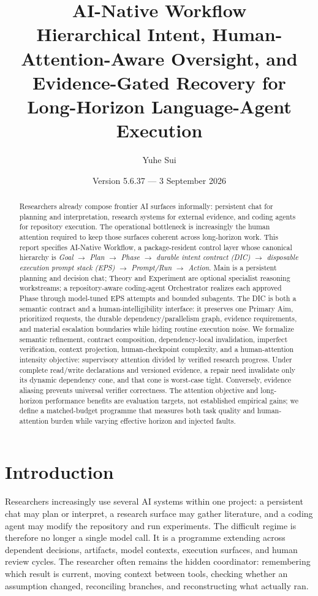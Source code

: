 \documentclass[11pt]{article}
\title{\textbf{AI-Native Workflow}\\\large Hierarchical Intent, Human-Attention-Aware Oversight, and Evidence-Gated Recovery for Long-Horizon Language-Agent Execution}
\author{Yuhe Sui}
\date{Version 5.6.37 --- 3 September 2026}
\begin{document}
\maketitle

\begin{abstract}
Researchers already compose frontier AI surfaces informally: persistent chat for planning and interpretation, research systems for external evidence, and coding agents for repository execution. The operational bottleneck is increasingly the human attention required to keep those surfaces coherent across long-horizon work. This report specifies AI-Native Workflow, a package-resident control layer whose canonical hierarchy is \emph{Goal $\rightarrow$ Plan $\rightarrow$ Phase $\rightarrow$ durable intent contract (DIC) $\rightarrow$ disposable execution prompt stack (EPS) $\rightarrow$ Prompt/Run $\rightarrow$ Action}. Main is a persistent planning and decision chat; Theory and Experiment are optional specialist reasoning workstreams; a repository-aware coding-agent Orchestrator realizes each approved Phase through model-tuned EPS attempts and bounded subagents. The DIC is both a semantic contract and a human-intelligibility interface: it preserves one Primary Aim, prioritized requests, the durable dependency/parallelism graph, evidence requirements, and material escalation boundaries while hiding routine execution noise. We formalize semantic refinement, contract composition, dependency-local invalidation, imperfect verification, context projection, human-checkpoint complexity, and a human-attention intensity objective: supervisory attention divided by verified research progress. Under complete read/write declarations and versioned evidence, a repair need invalidate only its dynamic dependency cone, and that cone is worst-case tight. Conversely, evidence aliasing prevents universal verifier correctness. The attention objective and long-horizon performance benefits are evaluation targets, not established empirical gains; we define a matched-budget programme that measures both task quality and human-attention burden while varying effective horizon and injected faults.
\end{abstract}

\tableofcontents
\newpage

\section{Introduction}
Researchers increasingly use several AI systems within one project: a persistent chat may plan or interpret, a research surface may gather literature, and a coding agent may modify the repository and run experiments. The difficult regime is therefore no longer a single model call. It is a programme extending across dependent decisions, artifacts, model contexts, execution surfaces, and human review cycles. The researcher often remains the hidden coordinator: remembering which result is current, moving context between tools, checking whether an assumption changed, reconciling branches, and reconstructing what actually ran.
\end{document}
